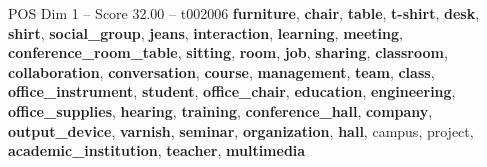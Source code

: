 \begin{textsample}{POS Dim 1 – Score 32.00 – t002006}  \label{ex:f1_pos_010}
\textbf{furniture}, \textbf{chair}, \textbf{table}, \textbf{t-shirt}, \textbf{desk}, \textbf{shirt}, \textbf{social\_group}, \textbf{jeans}, \textbf{interaction}, \textbf{learning}, \textbf{meeting}, \textbf{conference\_room\_table}, \textbf{sitting}, \textbf{room}, \textbf{job}, \textbf{sharing}, \textbf{classroom}, \textbf{collaboration}, \textbf{conversation}, \textbf{course}, \textbf{management}, \textbf{team}, \textbf{class}, \textbf{office\_instrument}, \textbf{student}, \textbf{office\_chair}, \textbf{education}, \textbf{engineering}, \textbf{office\_supplies}, \textbf{hearing}, \textbf{training}, \textbf{conference\_hall}, \textbf{company}, \textbf{output\_device}, \textbf{varnish}, \textbf{seminar}, \textbf{organization}, \textbf{hall}, campus, project, \textbf{academic\_institution}, \textbf{teacher}, \textbf{multimedia}

\end{textsample}
